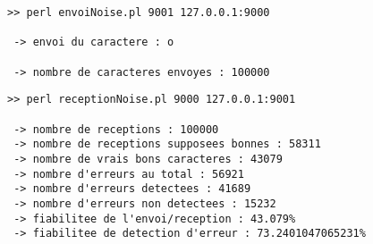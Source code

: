     \begin{lstlisting}
>> perl envoiNoise.pl 9001 127.0.0.1:9000

 -> envoi du caractere : o

 -> nombre de caracteres envoyes : 100000

    \end{lstlisting}

    \begin{lstlisting}
>> perl receptionNoise.pl 9000 127.0.0.1:9001

 -> nombre de receptions : 100000
 -> nombre de receptions supposees bonnes : 58311
 -> nombre de vrais bons caracteres : 43079
 -> nombre d'erreurs au total : 56921
 -> nombre d'erreurs detectees : 41689
 -> nombre d'erreurs non detectees : 15232
 -> fiabilitee de l'envoi/reception : 43.079%
 -> fiabilitee de detection d'erreur : 73.2401047065231%

    \end{lstlisting}
